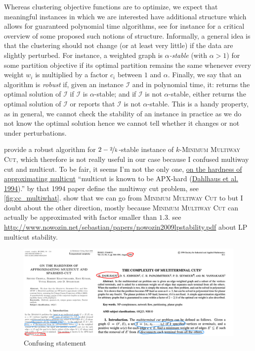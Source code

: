Whereas clustering objective functions are \NPh{} to optimize, we expect that meaningful instances
in which we are interested have additional structure which allows for guaranteed polynomial time
algorithms, see for instance \autocite{clusteringFeasibility15} for a critical overview of some
proposed such notions of structure. Informally, a general idea is that the clustering should not
change (or at least very little) if the data are slightly perturbed. For instance, a weighted graph
is \emph{$\alpha$-stable} (with $\alpha>1$) for some partition objective if its optimal partition
remains the same whenever every weight $w_i$ is multiplied by a factor $c_i$ between $1$ and
$\alpha$. Finally, we say that an algorithm is \emph{robust} if, given an instance $\mathcal{I}$ and
in polynomial time, it: returns the optimal solution of $\mathcal{I}$ if $\mathcal{I}$ is
$\alpha$-stable; and if $\mathcal{I}$ is not $\alpha$-stable, either returns the optimal solution of
$\mathcal{I}$ or reports that $\mathcal{I}$ is not $\alpha$-stable. This is a handy property, as in
general, we cannot check the stability of an instance in practice as we do not know the optimal
solution hence we cannot tell whether it changes or not under perturbations.

\Textcite{StableCC17} provide a robust algorithm for $2-\nicefrac{2}{k}$-stable instance of
$k$-\textsc{Minimum Multiway Cut}, which therefore is not really useful in our case because I confused
multiway cut and multicut. To be fair, it seems I'm not the only one, \href{http://pages.cs.wisc.edu/~shuchi/papers/multicut-hardness-full.pdf}{on the hardness of
   approximating multicut}
   \enquote{multicut is known to be APX-hard
      (\href{https://pdfs.semanticscholar.org/1cf6/4c2bdd4f1c384a55910606a64c8d831a96ba.pdf}%
   {Dahlhaus et al. 1994}).} by that 1994 paper define the multiway cut problem, see
   \autoref{fig:cc_multiwhat}. \Textcite[Theorem 24]{Bansal2004} show that we can go from
   \textsc{Minimum Multiway Cut} to \pcc{} but I doubt about the other direction, mostly because
   \textsc{Minimum Multiway Cut} can actually be approximated with factor smaller than $1.3$.
   see \url{http://www.nowozin.net/sebastian/papers/nowozin2009lpstability.pdf} about LP multicut
   stability.
\begin{figure}[htpb]
   \centering
   \includegraphics[width=0.9\linewidth]{assets/raw/multicut_vs_multiway.png}
   \caption{Confusing statement} \label{fig:cc_multiwhat}
\end{figure}


